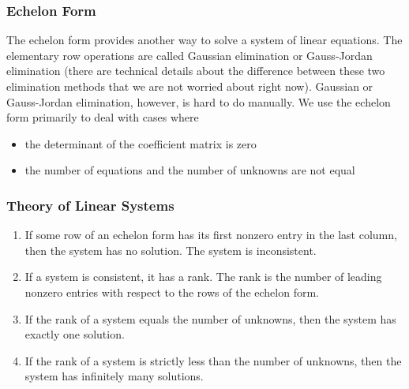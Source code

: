 \documentclass[xcolor=dvipsnames]{beamer}
\begin{document}
\begin{frame}
  \frametitle{Echelon Form}
  The echelon form provides another way to solve a system of linear
  equations. The elementary row operations are called \alert{Gaussian
    elimination} or \alert{Gauss-Jordan elimination} (there are
  technical details about the difference between these two elimination
  methods that we are not worried about right now). Gaussian or
  Gauss-Jordan elimination, however, is hard to do manually. We use
  the echelon form primarily to deal with cases where
  \begin{itemize}
  \item the determinant of the coefficient matrix is zero
  \item the number of equations and the number of unknowns are not
    equal
  \end{itemize}
\end{frame}

\begin{frame}
  \frametitle{Theory of Linear Systems}
  \begin{enumerate}
  \item If some row of an echelon form has its first nonzero entry in
    the last column, then the system has no solution. The system is
    \alert{inconsistent}. 
  \item If a system is consistent, it has a \alert{rank}. The rank is
    the number of leading nonzero entries with respect to the rows of
    the echelon form.
  \item If the rank of a system equals the number of unknowns, then
    the system has \alert{exactly one solution}.
  \item If the rank of a system is strictly less than the number of
    unknowns, then the system has \alert{infinitely many solutions}.
  \end{enumerate}
\end{frame}
\end{document}
